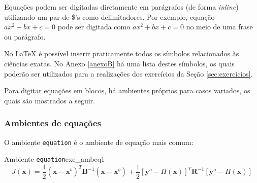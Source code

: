 Equações podem ser digitadas diretamente em parágrafos (de forma \textit{inline}) utilizando um par de \$'s como delimitadores. Por exemplo, equação $ax^2 + bx + c = 0$ pode ser digitada como \texttt{$ax^2 + bx + c = 0$} no meio de uma frase ou parágrafo.

No LaTeX é possível inserir praticamente todos os símbolos relacionados às ciências exatas. No Anexo \ref{anexoB} há uma lista destes símbolos, os quais poderão ser utilizados para a realizações dos exercícios da Seção \ref{sec:exercicios}.

%
%
%

Para digitar equações em blocos, há ambientes próprios para casos variados, os quais são mostrados a seguir.

\subsubsection*{Ambientes de equações}
\label{sec:amb_eqs}

O ambiente \texttt{equation} é o ambiente de equação mais comum:


\begin{texexptitled}[breakable,center lower,enhanced,middle=2mm]{Ambiente \texttt{equation}}{exe_ambeq1}
\begin{equation*}
\label{apI_eq:1}
J(\mathbf{x}) = \frac{1}{2}(\mathbf{x} - \mathbf{x}^{b})^{T}\mathbf{B}^{-1}(\mathbf{x} - \mathbf{x}^{b}) + \frac{1}{2}[\mathbf{y}^{o} - \textit{H}(\mathbf{x})]^{T}\mathbf{R}^{-1}[\mathbf{y}^{o} - \textit{H}(\mathbf{x})]
\end{equation*}
\end{texexptitled}

